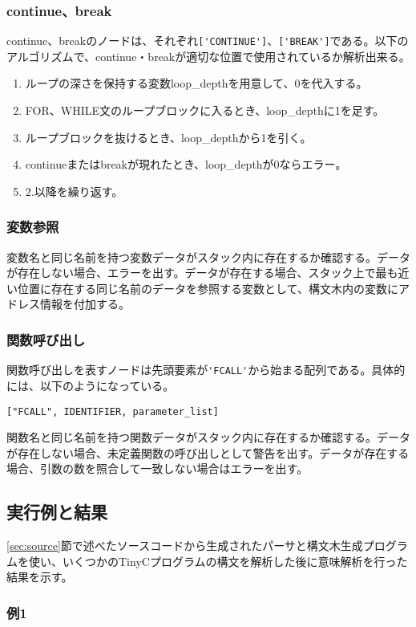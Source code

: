 \documentclass[titlepage, a4paper,12pt]{jarticle}
\begin{document}
\subsubsection{continue、break}
continue、breakのノードは、それぞれ\verb|['CONTINUE']|、\verb|['BREAK']|である。以下のアルゴリズムで、continue・breakが適切な位置で使用されているか解析出来る。
\begin{enumerate}
\item ループの深さを保持する変数loop\_depthを用意して、0を代入する。
\item FOR、WHILE文のループブロックに入るとき、loop\_depthに1を足す。
\item ループブロックを抜けるとき、loop\_depthから1を引く。
\item continueまたはbreakが現れたとき、loop\_depthが0ならエラー。
\item 2.以降を繰り返す。
\end{enumerate}
\subsubsection{変数参照}
\label{sec:ref}
変数名と同じ名前を持つ変数データがスタック内に存在するか確認する。データが存在しない場合、エラーを出す。データが存在する場合、スタック上で最も近い位置に存在する同じ名前のデータを参照する変数として、構文木内の変数にアドレス情報を付加する。
\subsubsection{関数呼び出し}
関数呼び出しを表すノードは先頭要素が\verb|'FCALL'|から始まる配列である。具体的には、以下のようになっている。
\begin{verbatim}
["FCALL", IDENTIFIER, parameter_list]
\end{verbatim}
関数名と同じ名前を持つ関数データがスタック内に存在するか確認する。データが存在しない場合、未定義関数の呼び出しとして警告を出す。データが存在する場合、引数の数を照合して一致しない場合はエラーを出す。
\subsection{実行例と結果}
\ref{sec:source}節で述べたソースコードから生成されたパーサと構文木生成プログラムを使い、いくつかのTinyCプログラムの構文を解析した後に意味解析を行った結果を示す。
\subsubsection{例1}

\end{document}
